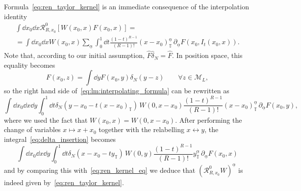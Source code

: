 \documentclass[a4paper, 11pt]{article}
\newcommand{\ren}{\mathcal{R}}								%
\newcommand{\kren}{\mathscr{R}}								%
\newcommand{\torus}{{\scriptstyle{\mathbb{T}}}}				%
\theoremstyle{thm}
\begin{document}
Formula~\eqref{eq:ren_taylor_kernel} is an immediate consequence of the interpolation identity
\begin{multline}
\label{eq:lm:interpolating_formula}
\int \dd{x_0} \dd{x} \ren^0_{R, x_0} [W(x_0, x) F(x_0,x)] = \\ 
= \int \dd{x_0} \dd{x} W(x_0, x) \sum_{\underline{\alpha}} \int_0^1 \dd{t} \frac{(1-t)^{R-1}}{(R-1)!} (x - x_0)^{\underline{\alpha}}_\torus \, \partial_{\underline{\alpha}} F(x_0, I_t(x_0, x)).
\end{multline}
Note that, according to our initial assumption, $\hat{F} \hat{\delta}_N = \hat{F}$. In position space, this equality becomes
\begin{equation}
F(x_0, z) = \int \dd{y} F(x_0, y) \delta_N(y - z) \qquad \forall z \in \mathcal{M}_L,
\end{equation}
so the right hand side of~\eqref{eq:lm:interpolating_formula} can be rewritten as
\begin{equation}
\label{eq:delta_insertion}
\int \dd{x_0} \dd{x} \dd{y} \int_0^1 \dd{t} \delta_N(y - x_0 - t(x - x_0)_\torus) \,
W(0, x-x_0) \frac{(1-t)^{R-1}}{(R-1)!} (x - x_0)^{\underline{\alpha}}_\torus \, \partial_{\underline{\alpha}} F(x_0, y),
\end{equation}
where we used the fact that $W(x_0, x) = W(0, x - x_0)$. After performing the change of variables $x \mapsto x + x_0$ together with the relabelling $x \leftrightarrow y$, the integral~\eqref{eq:delta_insertion} becomes
\begin{equation}
\int \dd{x}_0 \dd{x} \dd{y} \int_0^1 \dd{t} \delta_N(x - x_0 - t y_\torus) \,
W(0, y) \frac{(1-t)^{R-1}}{(R-1)!} y^{\underline{\alpha}}_\torus \, \partial_{\underline{\alpha}} F(x_0, x)
\end{equation}
and by comparing this with~\eqref{eq:ren_kernel_eq} we deduce that $(\kren_{R, x_0}^0 W)^{\underline{\alpha}}$ is indeed given by~\eqref{eq:ren_taylor_kernel}.
\end{document}
